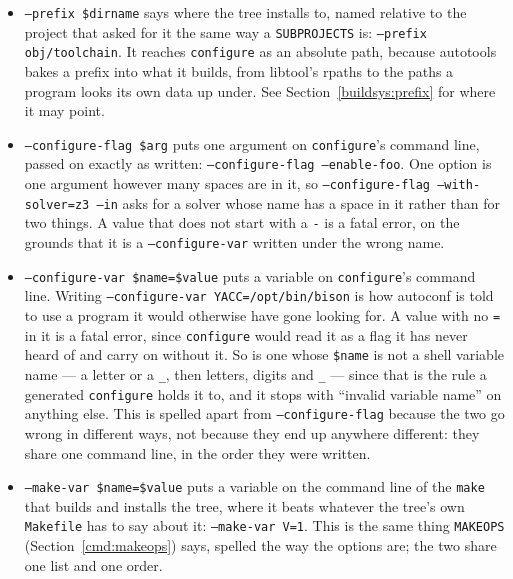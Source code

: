 \documentclass{article}
\begin{document}
\begin{itemize}
\item \texttt{--prefix \$dirname} says where the tree installs to,
  named relative to the project that asked for it the same way a
  \texttt{SUBPROJECTS} is: \texttt{--prefix obj/toolchain}.  It
  reaches \texttt{configure} as an absolute path, because autotools
  bakes a prefix into what it builds, from libtool's rpaths to the
  paths a program looks its own data up under.  See
  Section~\ref{buildsys:prefix} for where it may point.

\item \texttt{--configure-flag \$arg} puts one argument on
  \texttt{configure}'s command line, passed on exactly as written:
  \texttt{--configure-flag --enable-foo}.  One option is one argument
  however many spaces are in it, so \texttt{--configure-flag
  --with-solver=z3 --in} asks for a solver whose name has a space in
  it rather than for two things.  A value that does not start with a
  \texttt{-} is a fatal error, on the grounds that it is a
  \texttt{--configure-var} written under the wrong name.

\item \texttt{--configure-var \$name=\$value} puts a variable on
  \texttt{configure}'s command line.  Writing
  \texttt{--configure-var YACC=/opt/bin/bison} is how autoconf is
  told to use a program it would otherwise have gone looking for.  A
  value with no
  \texttt{=} in it is a fatal error, since \texttt{configure} would
  read it as a flag it has never heard of and carry on without it.
  So is one whose \texttt{\$name} is not a shell variable name --- a
  letter or a \texttt{\_}, then letters, digits and \texttt{\_} ---
  since that is the rule a generated \texttt{configure} holds it to,
  and it stops with ``invalid variable name'' on anything else.
  This is spelled apart from \texttt{--configure-flag} because the two
  go wrong in different ways, not because they end up anywhere
  different: they share one command line, in the order they were
  written.

\item \texttt{--make-var \$name=\$value} puts a variable on the
  command line of the \texttt{make} that builds and installs the tree,
  where it beats whatever the tree's own \texttt{Makefile} has to say
  about it: \texttt{--make-var V=1}.  This is the same thing
  \texttt{MAKEOPS} (Section~\ref{cmd:makeops}) says, spelled the way
  the options are; the two share one list and one order.


\end{itemize}
\end{document}
